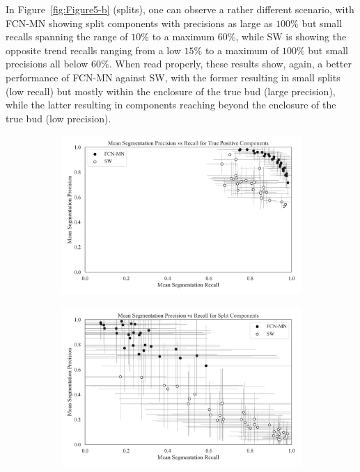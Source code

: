\documentclass[a4paper,authoryear,review]{elsarticle}
\begin{document}
	In Figure~\ref{fig:Figure5-b} (splits), one can observe a rather different scenario, with FCN-MN showing split components with precisions as large as $100\%$ but small recalls spanning the range of $10\%$ to a maximum $60\%$, while SW is showing the opposite trend recalls ranging from a low $15\%$ to a maximum of $100\%$ but small precisions all below $60\%$. When read properly, these results show, again, a better performance of FCN-MN against SW, with the former resulting in small splits (low recall) but mostly within the enclosure of the true bud (large precision), while the latter resulting in components reaching beyond the enclosure of the true bud (low precision).
	
	\begin{figure}%
		\centering
		\begin{subfigure}[b]{0.97\textwidth}
			\centering
			\includegraphics[width=\textwidth]{figures/Figure5-a.png}
			\caption{}
			\label{fig:Figure5-a}
		\end{subfigure}
		\hfill
		\begin{subfigure}[b]{0.97\textwidth}
			\centering
			\includegraphics[width=\textwidth]{figures/Figure5-b.png}

\end{subfigure}
\end{figure}
\end{document}
